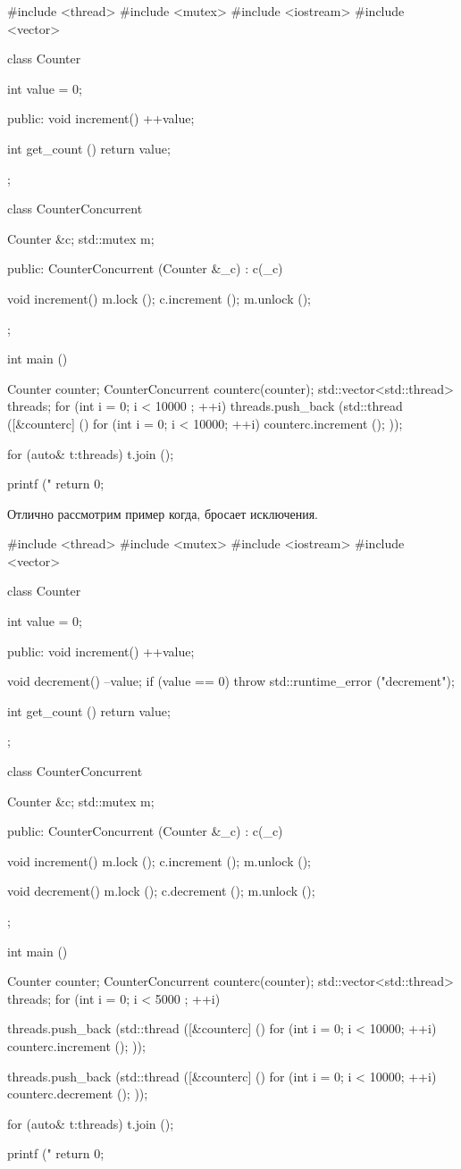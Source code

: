 \begin{cppcode}
#include <thread>
#include <mutex>
#include <iostream>
#include <vector>


class Counter {
  int value = 0;

public:
  void increment() {
    ++value;
  }

  int get_count () {
    return value;
  }
};

class CounterConcurrent {
  Counter &c;
  std::mutex m;

public:
  CounterConcurrent (Counter &_c) : c(_c){
  }

  void increment() {
    m.lock ();
    c.increment ();
    m.unlock ();
  }
};


int main () {
  Counter counter;
  CounterConcurrent counterc(counter);
  std::vector<std::thread> threads;
  for (int i = 0; i < 10000 ; ++i) {
    threads.push_back (std::thread ([&counterc] () {
        for (int i = 0; i < 10000; ++i) {
          counterc.increment ();
        }
    }));
  }

  for (auto& t:threads) {
    t.join ();
  }

  printf ("%
  return 0;
}
\end{cppcode}



Отлично рассмотрим пример когда,  бросает исключения.

\begin{cppcode}
#include <thread>
#include <mutex>
#include <iostream>
#include <vector>


class Counter {
  int value = 0;

public:
  void increment() {
    ++value;
  }

  void decrement() {
    --value;
    if (value == 0) {
      throw std::runtime_error ("decrement");
    }
  }

  int get_count () {
    return value;
  }
};

class CounterConcurrent {
  Counter &c;
  std::mutex m;

public:
  CounterConcurrent (Counter &_c) : c(_c){
  }

  void increment() {
    m.lock ();
    c.increment ();
    m.unlock ();
  }

  void decrement() {
    m.lock ();
    c.decrement ();
    m.unlock ();
  }
};


int main () {
  Counter counter;
  CounterConcurrent counterc(counter);
  std::vector<std::thread> threads;
  for (int i = 0; i < 5000 ; ++i) {
    threads.push_back (std::thread ([&counterc] () {
        for (int i = 0; i < 10000; ++i) {
          counterc.increment ();
        }
    }));

    threads.push_back (std::thread ([&counterc] () {
        for (int i = 0; i < 10000; ++i) {
          counterc.decrement ();
        }
    }));
  }

  for (auto& t:threads) {
    t.join ();
  }

  printf ("%
  return 0;
}
\end{cppcode}

